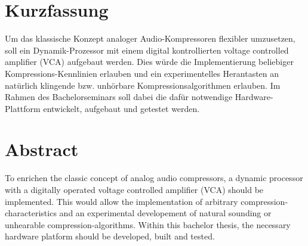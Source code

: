 ﻿\section*{Kurzfassung}
Um das klassische Konzept analoger Audio-Kompressoren flexibler umzusetzen, soll ein Dynamik-Prozessor mit einem digital kontrollierten voltage controlled amplifier (VCA) aufgebaut werden. Dies würde die Implementierung beliebiger Kompressions-Kennlinien erlauben und ein experimentelles Herantasten an natürlich klingende bzw. unhörbare Kompressionsalgorithmen erlauben. Im Rahmen des Bachelorseminars soll dabei die dafür notwendige Hardware-Plattform entwickelt, aufgebaut und getestet werden.
\section*{Abstract}

To enrichen the classic concept of analog audio compressors, a dynamic processor with a digitally operated voltage controlled amplifier (VCA) should be implemented. This would allow the implementation of arbitrary compression-characteristics and an experimental developement of natural sounding or unhearable compression-algorithms. Within this bachelor thesis, the necessary hardware platform should be developed, built and tested.